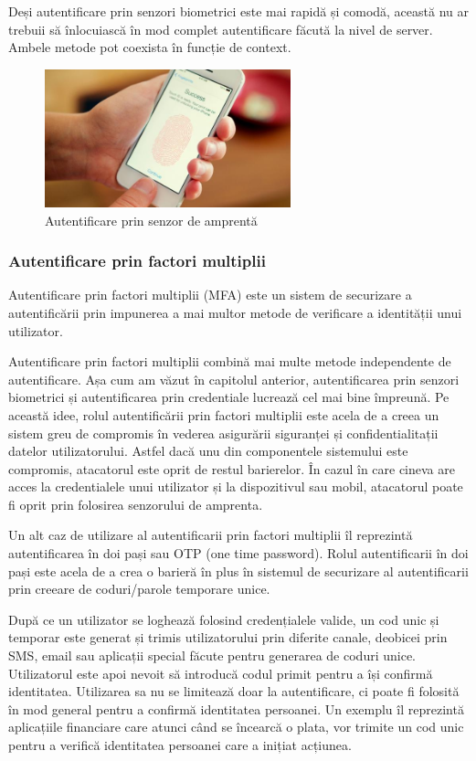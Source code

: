 \documentclass[12pt]{article}
\begin{document}
Deși autentificare prin senzori biometrici este mai rapidă și comodă, această nu ar trebuii
să înlocuiască în mod complet autentificare făcută la nivel de server. 
Ambele metode pot coexista în funcție de context.

\begin{figure}[H]
\centering
\includegraphics[height=4cm]{fingerprint-smartphone_0.jpg}
\caption{Autentificare prin senzor de amprentă}
\end{figure}


\newpage
\subsubsection{Autentificare prin factori multiplii}

Autentificare prin factori multiplii (MFA) este un sistem de securizare a autentificării
prin impunerea a mai multor metode de verificare a identității unui utilizator.

Autentificare prin factori multiplii combină mai multe metode independente de autentificare.
Așa cum am văzut în capitolul anterior, autentificarea prin senzori biometrici și autentificarea
prin credentiale lucrează cel mai bine împreună. Pe această idee, rolul autentificării prin factori
multiplii este acela de a creea un sistem greu de compromis în vederea asigurării siguranței și
confidentialitații datelor utilizatorului. Astfel dacă unu din componentele sistemului este compromis,
atacatorul este oprit de restul barierelor. În cazul în care cineva are acces la credentialele unui 
utilizator și la dispozitivul sau mobil, atacatorul poate fi oprit prin folosirea senzorului de amprenta.

Un alt caz de utilizare al autentificarii prin factori multiplii îl reprezintă autentificarea în doi pași
sau OTP (one time password). Rolul autentificarii în doi pași este acela de a crea o barieră în plus
în sistemul de securizare al autentificarii prin creeare de coduri/parole temporare unice.

După ce un utilizator se loghează folosind credențialele valide, un cod unic și temporar este generat
și trimis utilizatorului prin diferite canale, deobicei prin SMS, email sau aplicații special făcute
pentru generarea de coduri unice. Utilizatorul este apoi nevoit să introducă codul primit pentru
a își confirmă identitatea. Utilizarea sa nu se limitează doar la autentificare, ci poate fi folosită în
mod general pentru a confirmă identitatea persoanei. Un exemplu îl reprezintă aplicațiile financiare care
atunci când se încearcă o plata, vor trimite un cod unic pentru a verifică identitatea persoanei care 
a inițiat acțiunea.
\end{document}
